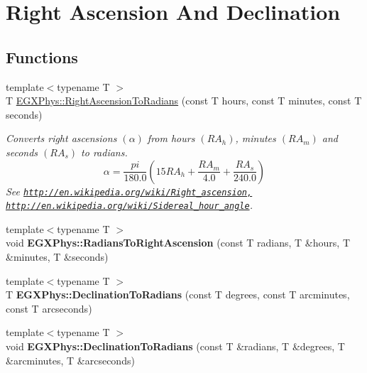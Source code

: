 \hypertarget{group___e_g_x_phys-_right_ascension_and_declination}{}\section{Right Ascension And Declination}
\label{group___e_g_x_phys-_right_ascension_and_declination}
\subsection*{Functions}
\begin{DoxyCompactItemize}
\item 
{\footnotesize template$<$typename T $>$ }\\T \mbox{\hyperlink{group___e_g_x_phys-_right_ascension_and_declination_ga25cb93de046663967af01d6687c423ae}{E\+G\+X\+Phys\+::\+Right\+Ascension\+To\+Radians}} (const T hours, const T minutes, const T seconds)
\begin{DoxyCompactList}\small\item\em Converts right ascensions $(\alpha)$ from hours $(RA_h)$, minutes $(RA_m)$ and seconds $(RA_s)$ to radians. \[\alpha=\frac{pi}{180.0}(15 RA_h + \frac{RA_m}{4.0} + \frac{RA_s}{240.0})\] See \href{http://en.wikipedia.org/wiki/Right_ascension,}{\tt http\+://en.\+wikipedia.\+org/wiki/\+Right\+\_\+ascension,} \href{http://en.wikipedia.org/wiki/Sidereal_hour_angle}{\tt http\+://en.\+wikipedia.\+org/wiki/\+Sidereal\+\_\+hour\+\_\+angle}. \end{DoxyCompactList}\item 
\mbox{\label{group___e_g_x_phys-_right_ascension_and_declination_ga1c7b757d2841b5ec067c87403e9b8867}} 
{\footnotesize template$<$typename T $>$ }\\void {\bfseries E\+G\+X\+Phys\+::\+Radians\+To\+Right\+Ascension} (const T radians, T \&hours, T \&minutes, T \&seconds)
\item 
\mbox{\label{group___e_g_x_phys-_right_ascension_and_declination_ga11a658bf9e00f4cb1682cda005ad39dc}} 
{\footnotesize template$<$typename T $>$ }\\T {\bfseries E\+G\+X\+Phys\+::\+Declination\+To\+Radians} (const T degrees, const T arcminutes, const T arcseconds)
\item 
\mbox{\label{group___e_g_x_phys-_right_ascension_and_declination_gad144150a085ddfeda10f1948f16b0a3e}} 
{\footnotesize template$<$typename T $>$ }\\void {\bfseries E\+G\+X\+Phys\+::\+Declination\+To\+Radians} (const T \&radians, T \&degrees, T \&arcminutes, T \&arcseconds)
\end{DoxyCompactItemize}


